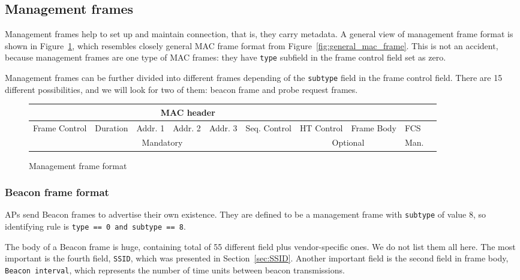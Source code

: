 \documentclass[12pt,a4paper,oneside,pdftex]{report}
\begin{document}
\subsection{Management frames}
\label{subsec:management_frames}

Management frames help to set up and maintain connection, that is, they carry metadata. A general view of management frame format is shown in Figure~\ref{fig:management_frame}, which resembles closely general MAC frame format from Figure~\ref{fig:general_mac_frame}. This is not an accident, because management frames are one type of MAC frames: they have \texttt{type} subfield in the frame control field set as zero.

Management frames can be further divided into different frames depending of the \texttt{subtype} field in the frame control field. There are 15 different possibilities, and we will look for two of them: beacon frame and probe request frames.

\begin{figure}
    \label{fig:management_frame}
    \begin{tabular}{|p{1cm}|p{1cm}|p{1cm}|p{1cm}|p{1cm}|p{1cm}|p{1cm}|p{1cm}|p{1cm}|p{1cm}|}
    
        \multicolumn{7}{|c|}{MAC header} &
        \multicolumn{2}{c|}{ } \\
    \hline 
        Frame Control &
        Dura\-tion &
        Addr. 1 &
        Addr. 2 &
        Addr. 3 &
        Seq. Control &
        HT Control &
        Frame Body &
        FCS \\
    \hline 
        \multicolumn{6}{|c|}{Mandatory} &
        \multicolumn{2}{c|}{Optional} &
        Man. \\

    \end{tabular}

    \caption{Management frame format}
\end{figure}

\subsubsection{Beacon frame format}
\label{subsubsec:beacon_frame}

APs send Beacon frames to advertise their own existence. They are defined to be a management frame with \texttt{subtype} of value 8, so identifying rule is \texttt{type == 0 and subtype == 8}.

The body of a Beacon frame is huge, containing total of 55 different field plus vendor-specific ones. We do not list them all here. The most important is the fourth field, \texttt{SSID}, which was presented in Section~\ref{sec:SSID}. Another important field is the second field in frame body, \texttt{Beacon interval}, which represents the number of time units between beacon transmissions.
\end{document}
